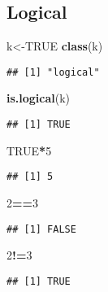 \documentclass[
]{article}
\newenvironment{Shaded}{\begin{snugshade}}{\end{snugshade}}
\newcommand{\ConstantTok}[1]{\textcolor[rgb]{0.56,0.35,0.01}{#1}}
\newcommand{\DecValTok}[1]{\textcolor[rgb]{0.00,0.00,0.81}{#1}}
\newcommand{\FunctionTok}[1]{\textcolor[rgb]{0.13,0.29,0.53}{\textbf{#1}}}
\newcommand{\NormalTok}[1]{#1}
\newcommand{\OtherTok}[1]{\textcolor[rgb]{0.56,0.35,0.01}{#1}}
\newcommand{\SpecialCharTok}[1]{\textcolor[rgb]{0.81,0.36,0.00}{\textbf{#1}}}
\begin{document}
\subsection{Logical}\label{logical}

\begin{Shaded}
\begin{Highlighting}[]
\NormalTok{k}\OtherTok{\textless{}{-}}\ConstantTok{TRUE}
\FunctionTok{class}\NormalTok{(k)}
\end{Highlighting}
\end{Shaded}

\begin{verbatim}
## [1] "logical"
\end{verbatim}

\begin{Shaded}
\begin{Highlighting}[]
\FunctionTok{is.logical}\NormalTok{(k)}
\end{Highlighting}
\end{Shaded}

\begin{verbatim}
## [1] TRUE
\end{verbatim}

\begin{Shaded}
\begin{Highlighting}[]
\ConstantTok{TRUE}\SpecialCharTok{*}\DecValTok{5}
\end{Highlighting}
\end{Shaded}

\begin{verbatim}
## [1] 5
\end{verbatim}

\begin{Shaded}
\begin{Highlighting}[]
\DecValTok{2}\SpecialCharTok{==}\DecValTok{3}
\end{Highlighting}
\end{Shaded}

\begin{verbatim}
## [1] FALSE
\end{verbatim}

\begin{Shaded}
\begin{Highlighting}[]
\DecValTok{2}\SpecialCharTok{!=}\DecValTok{3}
\end{Highlighting}
\end{Shaded}

\begin{verbatim}
## [1] TRUE
\end{verbatim}
\end{document}

